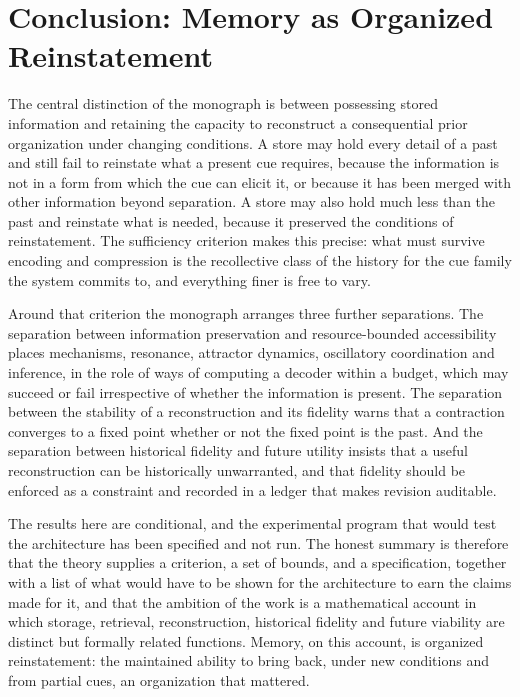 \chapter{Conclusion: Memory as Organized Reinstatement}\label{ch:conclusion}

The central distinction of the monograph is between possessing stored information and retaining the capacity to reconstruct a consequential prior organization under changing conditions. A store may hold every detail of a past and still fail to reinstate what a present cue requires, because the information is not in a form from which the cue can elicit it, or because it has been merged with other information beyond separation. A store may also hold much less than the past and reinstate what is needed, because it preserved the conditions of reinstatement. The sufficiency criterion makes this precise: what must survive encoding and compression is the recollective class of the history for the cue family the system commits to, and everything finer is free to vary.

Around that criterion the monograph arranges three further separations. The separation between information preservation and resource-bounded accessibility places mechanisms, resonance, attractor dynamics, oscillatory coordination and inference, in the role of ways of computing a decoder within a budget, which may succeed or fail irrespective of whether the information is present. The separation between the stability of a reconstruction and its fidelity warns that a contraction converges to a fixed point whether or not the fixed point is the past. And the separation between historical fidelity and future utility insists that a useful reconstruction can be historically unwarranted, and that fidelity should be enforced as a constraint and recorded in a ledger that makes revision auditable.

The results here are conditional, and the experimental program that would test the architecture has been specified and not run. The honest summary is therefore that the theory supplies a criterion, a set of bounds, and a specification, together with a list of what would have to be shown for the architecture to earn the claims made for it, and that the ambition of the work is a mathematical account in which storage, retrieval, reconstruction, historical fidelity and future viability are distinct but formally related functions. Memory, on this account, is organized reinstatement: the maintained ability to bring back, under new conditions and from partial cues, an organization that mattered.

